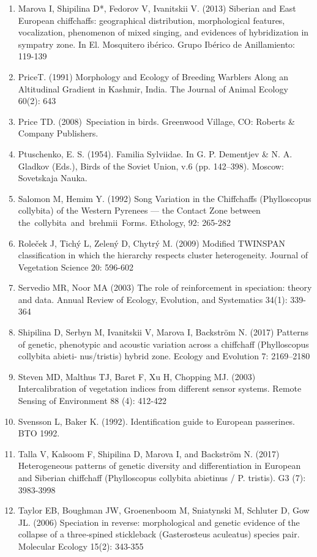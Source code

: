 \documentclass[11pt,a4paper]{article}
\begin{document}
\begin{enumerate}
\item Marova I, Shipilina D*, Fedorov V, Ivanitskii V. (2013) Siberian and East European chiffchaffs: geographical distribution, morphological features, vocalization, phenomenon of mixed singing, and evidences of hybridization in sympatry zone. In El. Mosquitero ibérico. Grupo Ibérico de Anillamiento: 119-139
\item PriceT. (1991) Morphology and Ecology of Breeding Warblers Along an Altitudinal Gradient in Kashmir, India. The Journal of Animal Ecology 60(2): 643 
\item Price TD. (2008) Speciation in birds. Greenwood Village, CO: Roberts \& Company Publishers.
\item Ptuschenko, E. S. (1954). Familia Sylviidae. In G. P. Dementjev \& N. A. Gladkov (Eds.), Birds of the Soviet Union, v.6 (pp. 142–398). Moscow: Sovetskaja Nauka.
\item Salomon M, Hemim Y. (1992) Song Variation in the Chiffchaffs (Phylloscopus collybita) of the Western Pyrenees — the Contact Zone between the collybita and brehmii Forms. Ethology, 92: 265-282 
\item Roleček J, Tichý L, Zelený D, Chytrý M. (2009) Modified TWINSPAN classification in which the hierarchy respects cluster heterogeneity. Journal of Vegetation Science 20: 596-602
\item Servedio MR, Noor MA (2003) The role of reinforcement in speciation: theory and data. Annual Review of Ecology, Evolution, and Systematics 34(1): 339-364
\item Shipilina D, Serbyn M, Ivanitskii V, Marova I, Backström N. (2017) Patterns of genetic, phenotypic and acoustic variation across a chiffchaff (Phylloscopus collybita abieti- nus/tristis) hybrid zone. Ecology and Evolution 7: 2169–2180
\item Steven MD, Malthus TJ, Baret F, Xu H, Chopping MJ. (2003) Intercalibration of vegetation indices from different sensor systems. Remote Sensing of Environment 88 (4): 412-422
\item Svensson L, Baker K. (1992). Identification guide to European passerines. BTO 1992.
\item Talla V, Kalsoom F, Shipilina D, Marova I, and Backström N. (2017) Heterogeneous patterns of genetic diversity and differentiation in European and Siberian chiffchaff (Phylloscopus collybita abietinus / P. tristis). G3 (7): 3983-3998
\item Taylor EB, Boughman JW, Groenenboom M, Sniatynski M, Schluter D, Gow JL. (2006) Speciation in reverse: morphological and genetic evidence of the collapse of a three‐spined stickleback (Gasterosteus aculeatus) species pair. Molecular Ecology 15(2): 343-355

\end{enumerate}
\end{document}
